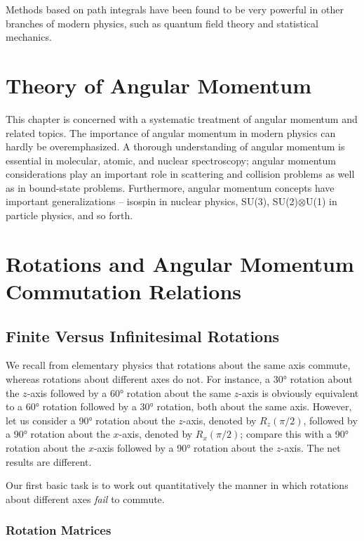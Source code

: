 \documentclass[11pt,a4paper]{article}
\begin{document}
Methods based on path integrals have been found to be very powerful in other branches of modern physics, such as quantum field theory and statistical mechanics.

\newpage
\section*{Theory of Angular Momentum}

This chapter is concerned with a systematic treatment of angular momentum and related topics. The importance of angular momentum in modern physics can hardly be overemphasized. A thorough understanding of angular momentum is essential in molecular, atomic, and nuclear spectroscopy; angular momentum considerations play an important role in scattering and collision problems as well as in bound-state problems. Furthermore, angular momentum concepts have important generalizations -- isospin in nuclear physics, SU(3), SU(2)$\otimes$U(1) in particle physics, and so forth.

\section{Rotations and Angular Momentum Commutation Relations}

\subsection{Finite Versus Infinitesimal Rotations}

We recall from elementary physics that rotations about the same axis commute, whereas rotations about different axes do not. For instance, a 30° rotation about the $z$-axis followed by a 60° rotation about the same $z$-axis is obviously equivalent to a 60° rotation followed by a 30° rotation, both about the same axis. However, let us consider a 90° rotation about the $z$-axis, denoted by $R_z(\pi/2)$, followed by a 90° rotation about the $x$-axis, denoted by $R_x(\pi/2)$; compare this with a 90° rotation about the $x$-axis followed by a 90° rotation about the $z$-axis. The net results are different.

Our first basic task is to work out quantitatively the manner in which rotations about different axes \textit{fail} to commute.

\subsubsection{Rotation Matrices}
\end{document}
